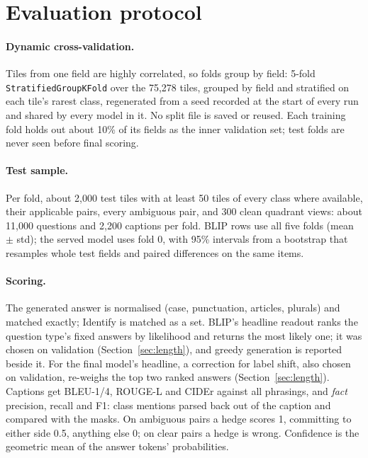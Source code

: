 \documentclass[10pt,twocolumn]{article}
\begin{document}
\section{Evaluation protocol}\label{sec:eval}
\paragraph{Dynamic cross-validation.} Tiles from one field are highly correlated, so folds group by field: 5-fold \texttt{StratifiedGroupKFold} over the 75,278 tiles, grouped by field and stratified on each tile's rarest class, regenerated from a seed recorded at the start of every run and shared by every model in it. No split file is saved or reused. Each training fold holds out about 10\% of its fields as the inner validation set; test folds are never seen before final scoring.

\paragraph{Test sample.} Per fold, about 2,000 test tiles with at least 50 tiles of every class where available, their applicable pairs, every ambiguous pair, and 300 clean quadrant views: about 11,000 questions and 2,200 captions per fold. BLIP rows use all five folds (mean $\pm$ std); the served model uses fold 0, with 95\% intervals from a bootstrap that resamples whole test fields and paired differences on the same items.

\paragraph{Scoring.} The generated answer is normalised (case, punctuation, articles, plurals) and matched exactly; Identify is matched as a set. BLIP's headline readout ranks the question type's fixed answers by likelihood and returns the most likely one; it was chosen on validation (Section~\ref{sec:length}), and greedy generation is reported beside it. For the final model's headline, a correction for label shift, also chosen on validation, re-weighs the top two ranked answers (Section~\ref{sec:length}). Captions get BLEU-1/4, ROUGE-L and CIDEr against all phrasings, and \emph{fact} precision, recall and F1: class mentions parsed back out of the caption and compared with the masks. On ambiguous pairs a hedge scores 1, committing to either side 0.5, anything else 0; on clear pairs a hedge is wrong. Confidence is the geometric mean of the answer tokens' probabilities.
\end{document}
